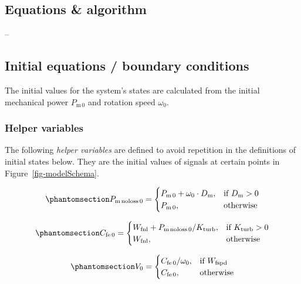 \documentclass[
  a4paper,
  DIV=11,
  numbers=noendperiod]{scrartcl}
\begin{document}
\subsection{Equations \& algorithm ~}\label{equations-algorithm}

--

\subsection{Initial equations / boundary
conditions}\label{initial-equations-boundary-conditions}

The initial values for the system's states are calculated from the
initial mechanical power \(P_\mathrm{m\,0}\) and rotation speed
\(\omega_\mathrm{0}\).

\subsubsection{Helper variables}\label{helper-variables}

The following \emph{helper variables} are defined to avoid repetition in
the definitions of initial states below. They are the initial values of
signals at certain points in Figure~\ref{fig-modelSchema}.

\begin{equation}\phantomsection\label{eq-initPmnoloss}{
P_\mathrm{m\,noloss\,0} = 
\begin{cases}
    P_\mathrm{m\,0} + \omega_\mathrm{0} \cdot D_\mathrm{m},& \text{if } D_\mathrm{m}> 0\\
    P_\mathrm{m\,0},              & \text{otherwise}
\end{cases}
}\end{equation}

\begin{equation}\phantomsection\label{eq-initCfe}{
C_\mathrm{fe\,0} = 
\begin{cases}
    W_\mathrm{fnl} + P_\mathrm{m\,noloss\,0} / K_\mathrm{turb},& \text{if } K_\mathrm{turb}>0\\
    W_\mathrm{fnl},              & \text{otherwise}
\end{cases}
}\end{equation}

\begin{equation}\phantomsection\label{eq-initValve}{
V_\mathrm{0} = 
\begin{cases}
    C_\mathrm{fe\,0} / \omega_\mathrm{0},& \text{if } W_\mathrm{fspd}\\
    C_\mathrm{fe\,0},              & \text{otherwise}
\end{cases}
}\end{equation}
\end{document}
